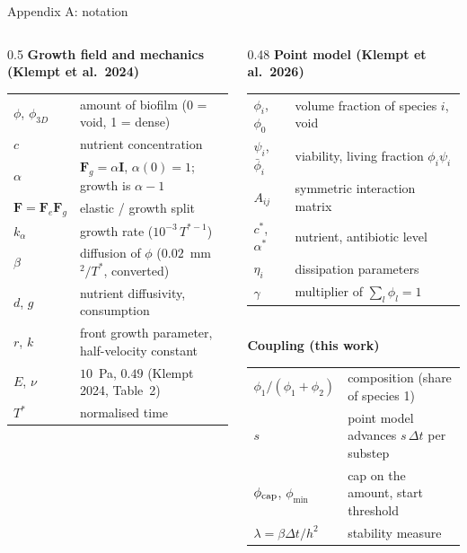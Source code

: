 \documentclass[aspectratio=169,11pt]{beamer}
\begin{document}
\appendix
{}
\begin{frame}[label=appA]{Appendix A: notation}
\scriptsize
\begin{columns}[T]
\begin{column}{0.5\textwidth}
\textbf{Growth field and mechanics (Klempt et al.\ 2024)}\\[2pt]
\begin{tabular}{@{}ll@{}}
\toprule
$\phi$, $\phi_{3D}$ & amount of biofilm (0 = void, 1 = dense)\\
$c$ & nutrient concentration\\
$\alpha$ & $\mathbf F_g=\alpha\mathbf I$, $\alpha(0)=1$; growth is $\alpha-1$\\
$\mathbf F=\mathbf F_e\mathbf F_g$ & elastic / growth split\\
$k_\alpha$ & growth rate ($10^{-3}\,T^{*-1}$)\\
$\beta$ & diffusion of $\phi$ ($0.02$~mm$^2/T^*$, converted)\\
$d$, $g$ & nutrient diffusivity, consumption\\
$r$, $k$ & front growth parameter, half-velocity constant\\
$E$, $\nu$ & $10$~Pa, $0.49$ (Klempt 2024, Table~2)\\
$T^*$ & normalised time\\
\bottomrule
\end{tabular}
\end{column}
\begin{column}{0.48\textwidth}
\textbf{Point model (Klempt et al.\ 2026)}\\[2pt]
\begin{tabular}{@{}ll@{}}
\toprule
$\phi_i$, $\phi_0$ & volume fraction of species $i$, void\\
$\psi_i$, $\bar\phi_i$ & viability, living fraction $\phi_i\psi_i$\\
$A_{ij}$ & symmetric interaction matrix\\
$c^*$, $\alpha^*$ & nutrient, antibiotic level\\
$\eta_i$ & dissipation parameters\\
$\gamma$ & multiplier of $\sum_l\phi_l=1$\\
\bottomrule
\end{tabular}\\[6pt]
\textbf{Coupling (this work)}\\[2pt]
\begin{tabular}{@{}ll@{}}
\toprule
$\phi_1/(\phi_1+\phi_2)$ & composition (share of species 1)\\
$s$ & point model advances $s\,\Delta t$ per substep\\
$\phi_{\rm cap}$, $\phi_{\min}$ & cap on the amount, start threshold\\
$\lambda=\beta\Delta t/h^2$ & stability measure\\
\bottomrule
\end{tabular}
\end{column}
\end{columns}
\end{frame}
\end{document}
